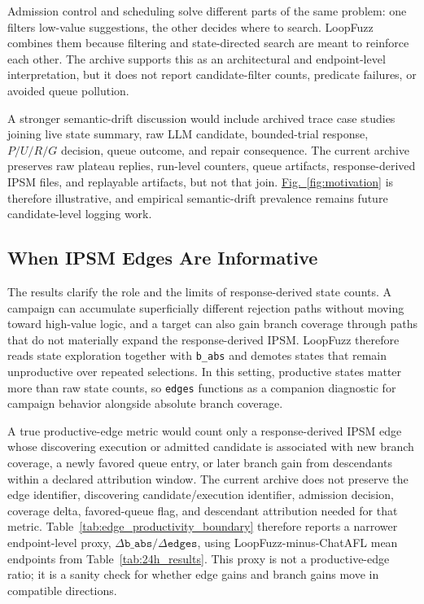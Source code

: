 \documentclass[final,5p,times,number]{elsarticle}
\newcommand{\figref}[1]{\hyperref[#1]{Fig.~\ref*{#1}}}
\begin{document}
Admission control and scheduling solve different parts of the same problem: one filters low-value suggestions, the other decides where to search. LoopFuzz combines them because filtering and state-directed search are meant to reinforce each other. The archive supports this as an architectural and endpoint-level interpretation, but it does not report candidate-filter counts, predicate failures, or avoided queue pollution.

A stronger semantic-drift discussion would include archived trace case studies joining live state summary, raw LLM candidate, bounded-trial response, $P/U/R/G$ decision, queue outcome, and repair consequence. The current archive preserves raw plateau replies, run-level counters, queue artifacts, response-derived IPSM files, and replayable artifacts, but not that join. \figref{fig:motivation} is therefore illustrative, and empirical semantic-drift prevalence remains future candidate-level logging work.

\subsection{When IPSM Edges Are Informative}
\label{sec:ipsm_edges_informative}

The results clarify the role and the limits of response-derived state counts. A campaign can accumulate superficially different rejection paths without moving toward high-value logic, and a target can also gain branch coverage through paths that do not materially expand the response-derived IPSM. LoopFuzz therefore reads state exploration together with \texttt{b\_abs} and demotes states that remain unproductive over repeated selections. In this setting, productive states matter more than raw state counts, so \texttt{edges} functions as a companion diagnostic for campaign behavior alongside absolute branch coverage.

A true productive-edge metric would count only a response-derived IPSM edge whose discovering execution or admitted candidate is associated with new branch coverage, a newly favored queue entry, or later branch gain from descendants within a declared attribution window. The current archive does not preserve the edge identifier, discovering candidate/execution identifier, admission decision, coverage delta, favored-queue flag, and descendant attribution needed for that metric. Table~\ref{tab:edge_productivity_boundary} therefore reports a narrower endpoint-level proxy, $\Delta\texttt{b\_abs}/\Delta\texttt{edges}$, using LoopFuzz-minus-ChatAFL mean endpoints from Table~\ref{tab:24h_results}. This proxy is not a productive-edge ratio; it is a sanity check for whether edge gains and branch gains move in compatible directions.
\end{document}
